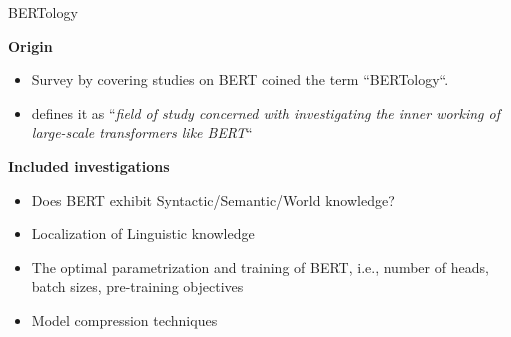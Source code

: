 
\begin{frame}{BERTology}

\vfill

\textbf{Origin}

\begin{itemize}
		\item Survey by  covering studies on BERT coined the term ``BERTology``.
		\item {} defines it as ``\textit{field of study concerned with investigating the inner working of large-scale transformers like BERT}``
\end{itemize}

\textbf{Included investigations} 
	
\begin{itemize}
		\item Does BERT exhibit Syntactic/Semantic/World knowledge?
		\item Localization of Linguistic knowledge
		\item The optimal parametrization and training of BERT, i.e., number of heads, batch sizes, pre-training objectives
				\item Model compression techniques
\end{itemize}
	
\vfill

\end{frame}


